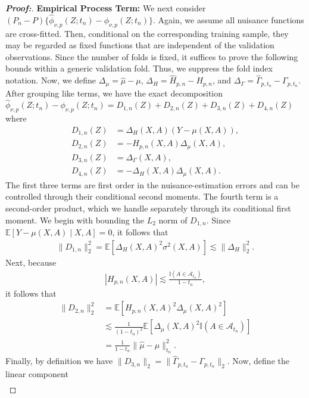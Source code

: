 \documentclass[11pt,twoside]{article}
\theoremstyle{definition}
\theoremstyle{remark}
\begin{document}
\begin{proof}[\textbf{Proof:}]
\textbf{Empirical Process Term:} We next consider $(P_n-P) \{  \widehat{\phi}_{\nu, p}(Z; t_n) -\phi_{\nu, p}(Z; t_n) \}$. Again, we assume all nuisance functions are cross-fitted. Then, conditional on the corresponding training sample, they may be regarded as fixed functions that are independent of the validation observations. Since the number of folds is fixed, it suffices to prove the following bounds within a generic validation fold. Thus, we suppress the fold index notation. Now, we define $\Delta_\mu=\widehat\mu-\mu$, $\Delta_H=\widehat H_{p,n}-H_{p,n}$, and $ \Delta_\Gamma = \widehat\Gamma_{p,t_n}-\Gamma_{p,t_n}.$ After grouping like terms, we have the exact decomposition $\widehat{\phi}_{\nu, p}(Z; t_n) -\phi_{\nu, p}(Z; t_n) = D_{1,n}(Z) + D_{2,n}(Z) + D_{3,n}(Z) + D_{4,n}(Z)$ where
\begin{align*}
    D_{1, n}(Z) &= \Delta_H(X,A)(Y-\mu(X,A)), \\ 
    D_{2, n}(Z) &= - H_{p,n}(X,A)\Delta_\mu(X,A),  \\
    D_{3, n}(Z) &= \Delta_\Gamma(X,A), \\
    D_{4, n}(Z) &= - \Delta_H(X,A)\Delta_\mu(X,A).
\end{align*}
The first three terms are first order in the nuisance-estimation errors and can be controlled through their conditional second moments. The fourth term is a second-order product, which we handle separately through its conditional first moment. We begin with bounding the $L_2$ norm of $D_{1,n}$. Since $\mathbb{E}[Y-\mu(X,A)\mid X,A]=0$, it follows that
\begin{align*}
    \|D_{1,n}\|_2^2 = \mathbb{E}\!\left[ \Delta_H(X,A)^2 \sigma^2(X,A) \right] \lesssim \|\Delta_H\|_2^2.
\end{align*}
Next, because
\begin{align*}
      |H_{p,n}(X,A)| \lesssim \frac{\mathbb{I}(A\in\mathcal A_{t_n})}{1-t_n},
\end{align*}
it follows that
\begin{align*}
    \|D_{2,n}\|_2^2 &= \mathbb{E}\!\left[H_{p,n}(X,A)^2 \Delta_\mu(X,A)^2 \right] \\
    &\lesssim \frac{1}{(1-t_n)^2} \mathbb{E}\!\left[ \Delta_\mu(X,A)^2 \mathbb{I}(A\in\mathcal A_{t_n}) \right] \\
    &= \frac{1}{1-t_n} \|\widehat\mu-\mu\|_{t_n}^2.
\end{align*}
Finally, by definition we have $ \|D_{3,n}\|_2 = \|\widehat\Gamma_{p,t_n}-\Gamma_{p,t_n}\|_2.$ Now, define the linear component
\begin{align*}

\end{align*}
\end{proof}
\end{document}
